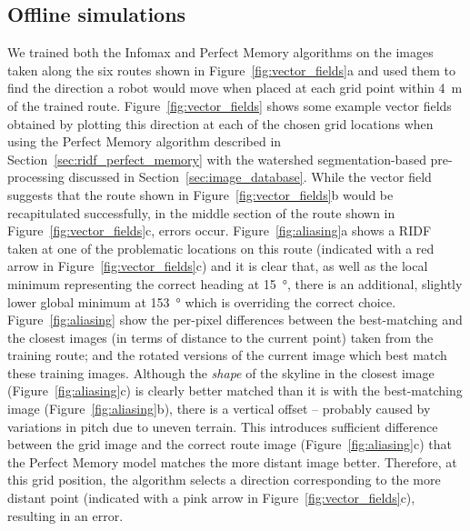 \documentclass[letterpaper]{article}
\begin{document}
\subsection{Offline simulations}
\label{sec:offline_simulations}
We trained both the Infomax and Perfect Memory algorithms on the images taken along the six routes shown in Figure~\ref{fig:vector_fields}a and used them to find the direction a robot would move when placed at each grid point within \SI{4}{\metre} of the trained route. 
Figure~\ref{fig:vector_fields} shows some example vector fields obtained by plotting this direction at each of the chosen grid locations when using the Perfect Memory algorithm described in Section~\ref{sec:ridf_perfect_memory} with the watershed segmentation-based pre-processing discussed in Section~\ref{sec:image_database}. 
While the vector field suggests that the route shown in Figure~\ref{fig:vector_fields}b would be recapitulated successfully, in the middle section of the route shown in Figure~\ref{fig:vector_fields}c, errors occur.
Figure~\ref{fig:aliasing}a shows a RIDF taken at one of the problematic locations on this route (indicated with a red arrow in Figure~\ref{fig:vector_fields}c) and it is clear that, as well as the local minimum representing the correct heading at \SI{15}{\degree}, there is an additional, slightly lower global minimum at \SI{153}{\degree} which is overriding the correct choice.
Figure~\ref{fig:aliasing} show the per-pixel differences between the best-matching and the closest images (in terms of distance to the current point) taken from the training route; and the rotated versions of the current image which best match these training images.
Although the \emph{shape} of the skyline in the closest image (Figure~\ref{fig:aliasing}c) is clearly better matched than it is with the best-matching image (Figure~\ref{fig:aliasing}b), there is a vertical offset -- probably caused by variations in pitch due to uneven terrain.
This introduces sufficient difference between the grid image and the correct route image (Figure~\ref{fig:aliasing}c) that the Perfect Memory model matches the more distant image better.
Therefore, at this grid position, the algorithm selects a direction corresponding to the more distant point (indicated with a pink arrow in Figure~\ref{fig:vector_fields}c), resulting in an error.
\end{document}
